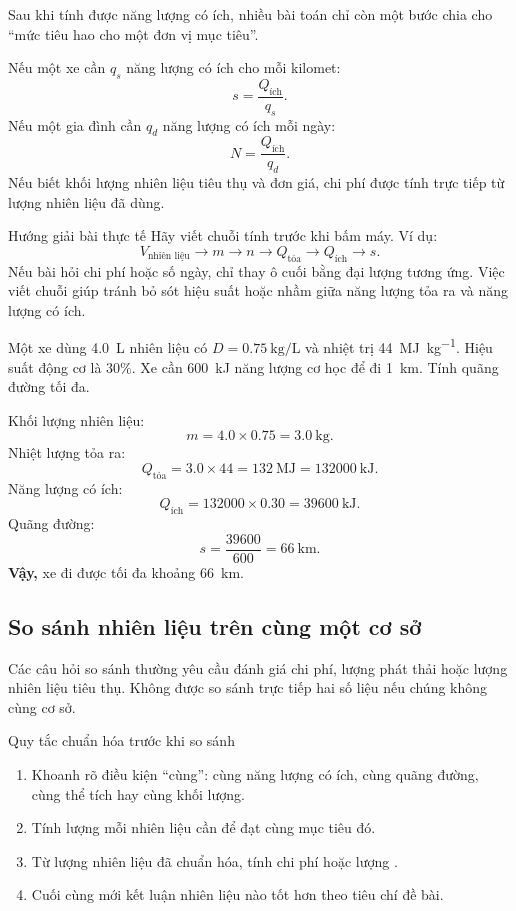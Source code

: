 Sau khi tính được năng lượng có ích, nhiều bài toán chỉ còn một bước chia cho ``mức tiêu hao cho một đơn vị mục tiêu''.

Nếu một xe cần $q_s$ năng lượng có ích cho mỗi kilomet:
\[
s=\frac{Q_{\text{ích}}}{q_s}.
\]
Nếu một gia đình cần $q_d$ năng lượng có ích mỗi ngày:
\[
N=\frac{Q_{\text{ích}}}{q_d}.
\]
Nếu biết khối lượng nhiên liệu tiêu thụ và đơn giá, chi phí được tính trực tiếp từ lượng nhiên liệu đã dùng.

\begin{ghinho}{Hướng giải bài thực tế}
Hãy viết chuỗi tính trước khi bấm máy. Ví dụ:
\[
V_{\text{nhiên liệu}}
\to m
\to n
\to Q_{\text{tỏa}}
\to Q_{\text{ích}}
\to s.
\]
Nếu bài hỏi chi phí hoặc số ngày, chỉ thay ô cuối bằng đại lượng tương ứng. Việc viết chuỗi giúp tránh bỏ sót hiệu suất hoặc nhầm giữa năng lượng tỏa ra và năng lượng có ích.
\end{ghinho}

\begin{vidu}
Một xe dùng \SI{4.0}{\liter} nhiên liệu có $D=\SI{0.75}{\kilo\gram\per\liter}$ và nhiệt trị \SI{44}{\mega\joule\per\kilo\gram}. Hiệu suất động cơ là $30\%$. Xe cần \SI{600}{\kilo\joule} năng lượng cơ học để đi \SI{1}{\kilo\metre}. Tính quãng đường tối đa.
\end{vidu}
\begin{loigiai}
Khối lượng nhiên liệu:
\[
m=4.0\times0.75=\SI{3.0}{\kilo\gram}.
\]
Nhiệt lượng tỏa ra:
\[
Q_{\text{tỏa}}=3.0\times44=\SI{132}{\mega\joule}=\SI{132000}{\kilo\joule}.
\]
Năng lượng có ích:
\[
Q_{\text{ích}}=132000\times0.30=\SI{39600}{\kilo\joule}.
\]
Quãng đường:
\[
s=\frac{39600}{600}=\SI{66}{\kilo\metre}.
\]
\textbf{Vậy,} xe đi được tối đa khoảng \SI{66}{\kilo\metre}.
\end{loigiai}

\subsection{So sánh nhiên liệu trên cùng một cơ sở}

Các câu hỏi so sánh thường yêu cầu đánh giá chi phí, lượng  phát thải hoặc lượng nhiên liệu tiêu thụ. Không được so sánh trực tiếp hai số liệu nếu chúng không cùng cơ sở.

\begin{ghinho}{Quy tắc chuẩn hóa trước khi so sánh}
\begin{enumerate}
\item Khoanh rõ điều kiện ``cùng'': cùng năng lượng có ích, cùng quãng đường, cùng thể tích hay cùng khối lượng.
\item Tính lượng mỗi nhiên liệu cần để đạt cùng mục tiêu đó.
\item Từ lượng nhiên liệu đã chuẩn hóa, tính chi phí hoặc lượng .
\item Cuối cùng mới kết luận nhiên liệu nào tốt hơn theo tiêu chí đề bài.
\end{enumerate}
\end{ghinho}

